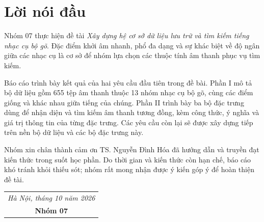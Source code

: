 \documentclass[11pt,a4paper]{article}
\begin{document}
\section*{Lời nói đầu}
Nhóm 07 thực hiện đề tài \emph{Xây dựng hệ cơ sở dữ liệu lưu trữ và tìm kiếm tiếng nhạc cụ bộ gõ}. Đặc điểm khởi âm nhanh, phổ đa dạng và sự khác biệt về độ ngân giữa các nhạc cụ là cơ sở để nhóm lựa chọn các thuộc tính âm thanh phục vụ tìm kiếm.

Báo cáo trình bày kết quả của hai yêu cầu đầu tiên trong đề bài. Phần I mô tả bộ dữ liệu gồm 655 tệp âm thanh thuộc 13 nhóm nhạc cụ bộ gõ, cùng các điểm giống và khác nhau giữa tiếng của chúng. Phần II trình bày ba bộ đặc trưng dùng để nhận diện và tìm kiếm âm thanh tương đồng, kèm công thức, ý nghĩa và giá trị thông tin của từng đặc trưng. Các yêu cầu còn lại sẽ được xây dựng tiếp trên nền bộ dữ liệu và các bộ đặc trưng này.

Nhóm xin chân thành cảm ơn TS. Nguyễn Đình Hóa đã hướng dẫn và truyền đạt kiến thức trong suốt học phần. Do thời gian và kiến thức còn hạn chế, báo cáo khó tránh khỏi thiếu sót; nhóm rất mong nhận được ý kiến góp ý để hoàn thiện đề tài.

\vspace{1cm}
\hfill\begin{tabular}{c}
\textit{Hà Nội, tháng 10 năm 2026}\\
\textbf{Nhóm 07}
\end{tabular}
\clearpage
\end{document}
